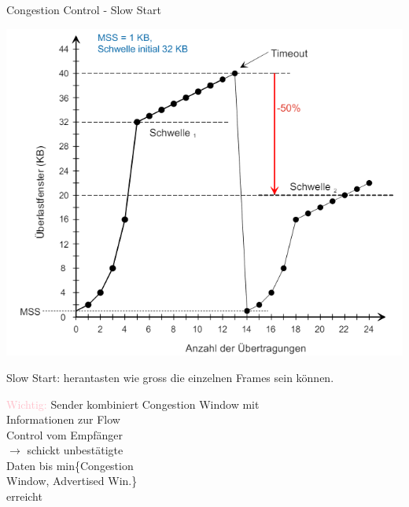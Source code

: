 \begin{concept}{Congestion Control - Slow Start}\\
    \begin{minipage}{0.6\linewidth}
        \includegraphics[width=1\linewidth]{images/congestion_control.png}
    \end{minipage}
    \begin{minipage}{0.39\linewidth}
        {\small
        Slow Start: herantasten wie gross die einzelnen Frames sein können.

        \vspace{1mm}

        \textcolor{pink}{Wichtig:} Sender kombiniert Congestion Window mit\\ Informationen zur Flow\\ Control vom Empfänger\\ $\rightarrow$ schickt unbestätigte \\Daten bis min\{Congestion\\ Window, Advertised Win.\}\\ erreicht
        }
    \end{minipage}
\end{concept}

